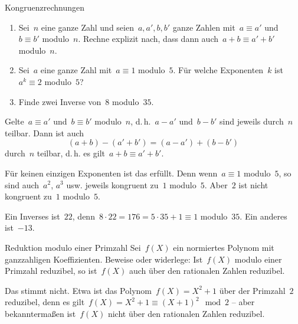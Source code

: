\documentclass{algblatt}
\begin{document}
\begin{aufgabe}{Kongruenzrechnungen}
\begin{enumerate}
\item Sei~$n$ eine ganze Zahl und seien~$a,a', b,b'$ ganze Zahlen mit~$a \equiv
a'$ und~$b \equiv b'$ modulo~$n$. Rechne explizit nach, dass dann auch~$a+b
\equiv a'+b'$ modulo~$n$.
\item Sei~$a$ eine ganze Zahl mit~$a \equiv 1$ modulo~$5$. Für welche
Exponenten~$k$ ist~$a^k \equiv 2$ modulo~$5$?
\item Finde zwei Inverse von~$8$ modulo~$35$.
\end{enumerate}

\begin{loesungE}
\item Gelte~$a \equiv a'$ und~$b \equiv b'$ modulo~$n$, d.\,h.~$a - a'$ und~$b
- b'$ sind jeweils durch~$n$ teilbar. Dann ist auch
\[ (a+b) - (a'+b') = (a-a') + (b-b') \]
durch~$n$ teilbar, d.\,h. es gilt~$a+b \equiv a'+b'$.

\item Für keinen einzigen Exponenten ist das erfüllt. Denn wenn~$a \equiv 1$
modulo~$5$, so sind auch~$a^2$, $a^3$ usw. jeweils kongruent zu~$1$ modulo~$5$.
Aber~$2$ ist nicht kongruent zu~$1$ modulo~$5$.

\item Ein Inverses ist~$22$, denn~$8 \cdot 22 = 176 = 5 \cdot 35 + 1 \equiv 1$
modulo~$35$. Ein anderes ist~$-13$.
\end{loesungE}
\end{aufgabe}

\begin{aufgabe}{Reduktion modulo einer Primzahl}
Sei~$f(X)$ ein normiertes Polynom mit ganzzahligen Koeffizienten. Beweise oder
widerlege: Ist~$f(X)$ modulo einer Primzahl reduzibel, so ist~$f(X)$ auch über
den rationalen Zahlen reduzibel.

\begin{loesung}
Das stimmt nicht. Etwa ist das Polynom~$f(X) = X^2 + 1$ über der Primzahl~$2$
reduzibel, denn es gilt~$f(X) = X^2 + 1 \equiv (X + 1)^2 \mod 2$ -- aber
bekanntermaßen ist~$f(X)$ nicht über den rationalen Zahlen reduzibel.
\end{loesung}
\end{aufgabe}
\end{document}
